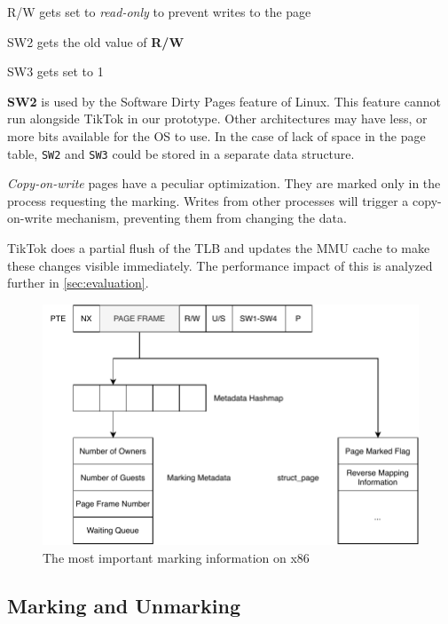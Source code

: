 \documentclass[conference]{IEEEtran}
\newcommand{\sysname}{TikTok}
\begin{document}
\begin{LaTeXdescription}
  \item[R/W] gets set to \emph{read-only} to prevent writes to the page
  \item[SW2] gets the old value of \textbf{R/W}
  \item[SW3] gets set to 1 
\end{LaTeXdescription}

\textbf{SW2} is used by the Software Dirty Pages
feature of Linux. This feature cannot run alongside \sysname{} in our prototype.
Other architectures may have less, or more bits available for the OS to use. In
the case of lack of space in the page table, \texttt{SW2} and \texttt{SW3} could
be stored in a separate data structure.

\emph{Copy-on-write} pages have a peculiar optimization. They are marked only in
the process requesting the marking. Writes from other processes will trigger a
copy-on-write mechanism, preventing them from changing the data.

\sysname{} does a partial flush of the TLB and updates the MMU cache to make these
changes visible immediately. The performance impact of this is analyzed further
in \autoref{sec:evaluation}.

\begin{figure}[]
  \centering
  \includegraphics[width=\linewidth]{img/book-keeping.pdf}
  \caption{The most important marking information on x86}
  \label{fig:bookkeeping}
\end{figure}

\subsection{Marking and Unmarking}
\end{document}
